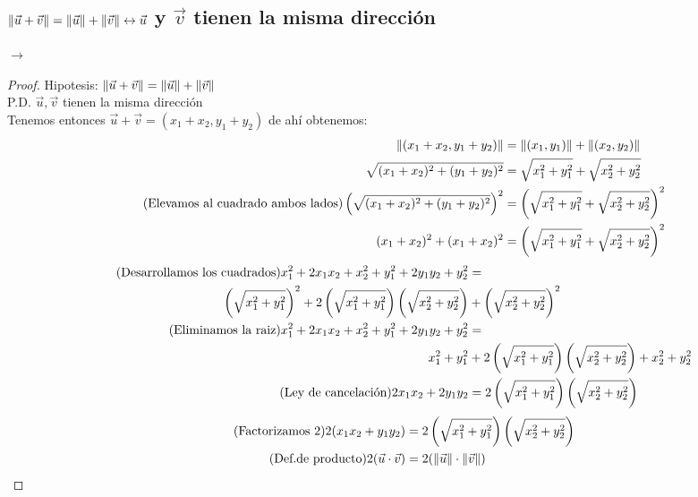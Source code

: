 \documentclass[14pt]{extarticle}
\DeclarePairedDelimiter\norm{\lVert}{\rVert}%
\begin{document}
    \subsection{$\norm{\vec{u}+\vec{v}} = \norm{\vec{u}} + \norm{\vec{v}} \leftrightarrow \vec{u}$ y $\vec{v}$ tienen la misma dirección}
    $\rightarrow$ \\
    \begin{proof}
        Hipotesis: $\norm{\vec{u}+\vec{v}} = \norm{\vec{u}} + \norm{\vec{v}}$ \\
        P.D. $\vec{u},\vec{v}$ tienen la misma dirección \\
        Tenemos entonces $\vec{u}+\vec{v} = (x_1+x_2,y_1+y_2)$ de ahí obtenemos:
        \begin{align}
            \notag \norm{(x_1+x_2,y_1+y_2)} &= \norm{(x_1,y_1)} + \norm{(x_2,y_2)} \\
            \notag \sqrt{(x_1+x_2)^2+(y_1+y_2)^2} &=  \sqrt{x_1^2+y_1^2} + \sqrt{x_2^2+y_2^2} \\
            \tag{Elevamos al cuadrado ambos lados} \left(\sqrt{(x_1+x_2)^2+(y_1+y_2)^2}\right)^2 &=  \left(\sqrt{x_1^2+y_1^2} + \sqrt{x_2^2+y_2^2}\right)^2 \\
            \notag (x_1+x_2)^2+(x_1+x_2)^2 &= \left(\sqrt{x_1^2+y_1^2} + \sqrt{x_2^2+y_2^2}\right)^2
        \end{align}
        \begin{align}
            \tag{Desarrollamos los cuadrados} x_1^2+2x_1x_2+x_2^2+y_1^2+2y_1y_2+y_2^2 &=  \\
            \notag \left(\sqrt{x_1^2+y_1^2}\right)^2 + 2\left(\sqrt{x_1^2+y_1^2}\right)\left(\sqrt{x_2^2+y_2^2}\right) &+ \left(\sqrt{x_2^2+y_2^2}\right)^2 \\
            \tag{Eliminamos la raiz} x_1^2+2x_1x_2+x_2^2+y_1^2+2y_1y_2+y_2^2 &= \\
            \notag x_1^2+y_1^2 &+ 2 \left(\sqrt{x_1^2+y_1^2}\right) \left(\sqrt{x_2^2+y_2^2}\right) + x_2^2+y_2^2 \\
            \tag{Ley de cancelación} 2x_1x_2 + 2y_1y_2 &= 2 \left(\sqrt{x_1^2+y_1^2}\right) \left(\sqrt{x_2^2+y_2^2}\right)
        \end{align}
        \begin{align}
            \tag{Factorizamos $2$} 2(x_1x_2 + y_1y_2) &= 2 \left(\sqrt{x_1^2+y_1^2}\right) \left(\sqrt{x_2^2+y_2^2}\right) \\
            \tag{Def.de producto} 2(\vec{u} \cdot \vec{v}) &= 2 (\norm{\vec{u}} \cdot \norm{\vec{v}}) \\

\end{align}
\end{proof}
\end{document}
